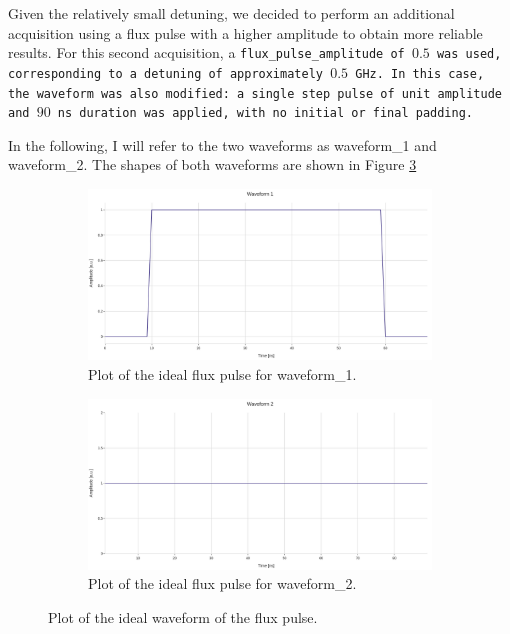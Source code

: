 Given the relatively small detuning, we decided to perform an additional acquisition using a flux pulse with a higher amplitude to obtain more reliable results.
For this second acquisition, a \tt{flux\_pulse\_amplitude} of $0.5$ was used, corresponding to a detuning of approximately $0.5$ GHz. 
In this case, the waveform was also modified: a single step pulse of unit amplitude and $90$ ns duration was applied, with no initial or final padding.

In the following, I will refer to the two waveforms as waveform\_1 and waveform\_2. 
The shapes of both waveforms are shown in Figure \ref{fig:ideal_waveform}

\begin{figure}[h!]
    \centering    
    \begin{subfigure}[t]{0.45\textwidth}
        \includegraphics[width=\textwidth]{figures/png/Cryoscope/waveform1.png}
        \caption{Plot of the ideal flux pulse for waveform\_1.}
        \label{fig:waveform1}
    \end{subfigure}
    \hfill
    \begin{subfigure}[t]{0.45\textwidth}
        \includegraphics[width=\textwidth]{figures/png/Cryoscope/waveform2.png}
        \caption{Plot of the ideal flux pulse for waveform\_2.}
        \label{fig:waveform2}
    \end{subfigure}

    \caption{Plot of the ideal waveform of the flux pulse.}
    \label{fig:ideal_waveform}
\end{figure}

